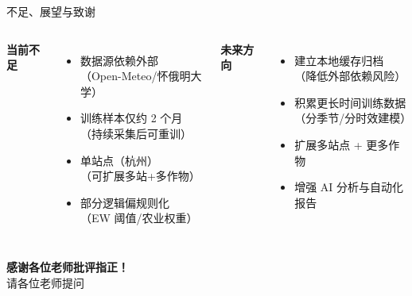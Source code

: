 \documentclass[aspectratio=169,14pt]{beamer}
\begin{document}
\begin{frame}{不足、展望与致谢}
  \begin{columns}[T]
      \textbf{\textcolor{primary}{当前不足}}
      \begin{itemize}
        \item 数据源依赖外部\\{\small（Open-Meteo/怀俄明大学）}
        \item 训练样本仅约 2 个月\\{\small （持续采集后可重训）}
        \item 单站点（杭州）\\{\small （可扩展多站+多作物）}
        \item 部分逻辑偏规则化\\{\small （EW 阈值/农业权重）}
      \end{itemize}
      \textbf{\textcolor{primary}{未来方向}}
      \begin{itemize}
        \item 建立本地缓存归档\\{\small （降低外部依赖风险）}
        \item 积累更长时间训练数据\\{\small （分季节/分时效建模）}
        \item 扩展多站点 + 更多作物
        \item 增强 AI 分析与自动化报告
      \end{itemize}
  \end{columns}
  \vspace{6mm}
  \begin{center}
    {\Large\textcolor{primary}{\textbf{感谢各位老师批评指正！}}}\\[2mm]
    {\normalsize 请各位老师提问}
  \end{center}
\end{frame}
\end{document}
